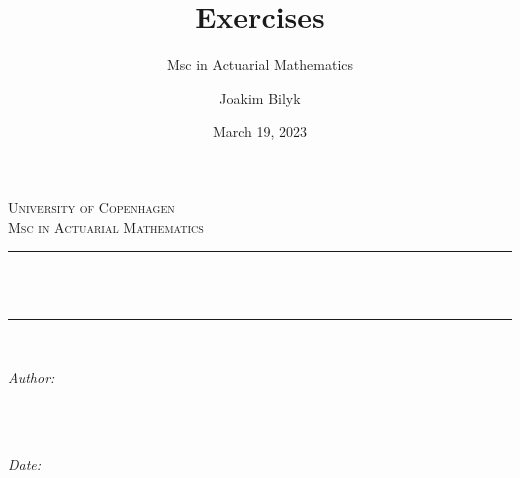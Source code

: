 \documentclass[
]{book}
\title{Exercises}
\subtitle{Msc in Actuarial Mathematics}
\author{Joakim Bilyk}
\date{March 19, 2023}
\begin{document}


{
\begin{titlepage}
\newcommand{\HRule}{\rule{\linewidth}{0.5mm}} %

\center %
 

\textsc{\LARGE University of Copenhagen}\\[4cm] %
\textsc{\Large Msc in Actuarial Mathematics}\\[0.5cm] %


\HRule \\[0.4cm]
{ \huge \bfseries \thetitle}\\[0.4cm] %
\HRule \\[1.5cm]
 

\begin{minipage}{0.4\textwidth}
\begin{flushleft} \large
\emph{Author:}\\
\textsc{\theauthor} \\
\end{flushleft}
\end{minipage}
~
\begin{minipage}{0.4\textwidth}
\begin{flushright} \large
\emph{Date:} \\
\textsc{\thedate} \\
\end{flushright}
\end{minipage}\\[2cm]


\end{titlepage}}
\end{document}
